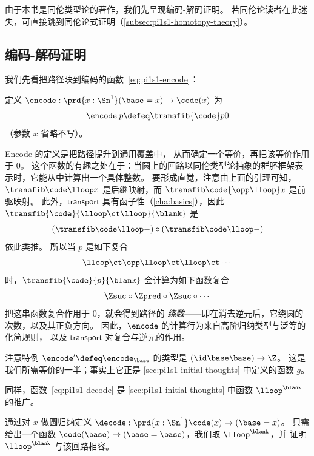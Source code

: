 由于本书是同伦类型论的著作，我们先呈现编码-解码证明。
若同伦论读者在此迷失，可直接跳到同伦论式证明（\cref{subsec:pi1s1-homotopy-theory}）。

%
%
%

\subsection{编码-解码证明}
\label{subsec:pi1s1-encode-decode}

%
%
%
我们先看把路径映到编码的函数~\eqref{eq:pi1s1-encode}：
\begin{defn}
定义 $\encode : \prd{x : \Sn ^1} (\base=x) \rightarrow  \code(x)$ 为
\[
\encode \: p \defeq \transfib{\code} p 0
\]
（参数 $x$ 省略不写）。
\end{defn}
Encode 的定义是把路径提升到通用覆盖中，
从而确定一个等价，再把该等价作用于 $0$。
这个函数的有趣之处在于：当圆上的回路以同伦类型论抽象的群胚框架表示时，它能从中计算出一个具体整数。
要形成直觉，注意由上面的引理可知，
$\transfib \code \lloop x$ 是后继映射，而 $\transfib \code {\opp
  \lloop} x$ 是前驱映射。
此外，$\mathsf{transport}$ 具有函子性（\cref{cha:basics}），因此
$\transfib{\code} {\lloop \ct \lloop}{\blank}$ 是
\[(\transfib \code \lloop-) \circ (\transfib \code \lloop-)\]
依此类推。
所以当 $p$ 是如下复合
\[
\lloop \ct \opp \lloop \ct \lloop \ct \cdots
\]
时，$\transfib{\code}{p}{\blank}$ 会计算为如下函数复合
\[
\Zsuc \circ \Zpred \circ \Zsuc \circ \cdots
\]
把这串函数复合作用于 0，就会得到路径的
%
\emph{绕数}——即在消去逆元后，它绕圆的次数，以及其正负方向。
因此，$\encode$ 的计算行为来自高阶归纳类型与泛等的化简规则，
以及 $\mathsf{transport}$ 对复合与逆元的作用。

注意特例 $\encode' \defeq \encode_{\base}$ 的类型是
$(\id \base \base) \rightarrow \Z$。
这是我们所需等价的一半；事实上它正是 \cref{sec:pi1s1-initial-thoughts} 中定义的函数 $g$。

同样，函数~\eqref{eq:pi1s1-decode} 是 \cref{sec:pi1s1-initial-thoughts} 中函数 $\lloop^{\blank}$ 的推广。

\begin{defn}\label{thm:pi1s1-decode}
通过对 $x$ 做圆归纳定义 $\decode : \prd{x : \Sn ^1}\code(x) \rightarrow (\base=x)$。
只需给出一个函数
${\code(\base) \rightarrow (\base=\base)}$，我们取 $\lloop^{\blank}$，并
证明 $\lloop^{\blank}$ 与该回路相容。
\end{defn}

